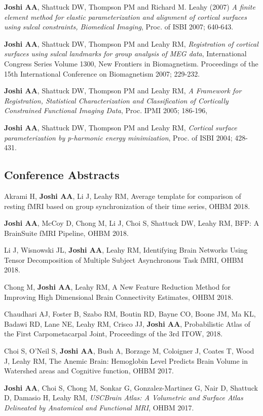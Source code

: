 \documentclass[overlapped,line,letterpaper]{res}
\begin{document}
\begin{resume}
\textbf{Joshi AA}, Shattuck DW, Thompson PM and Richard M. Leahy (2007) \textit{A finite element method for elastic parameterization and alignment of cortical surfaces using sulcal constraints, Biomedical Imaging}, Proc. of ISBI 2007; 640-643. 

\textbf{Joshi AA}, Shattuck DW, Thompson PM and Leahy RM, \textit{Registration of cortical surfaces using sulcal landmarks for group analysis of MEG data}, International Congress Series Volume 1300, New Frontiers in Biomagnetism. Proceedings of the 15th International Conference on Biomagnetism 2007; 229-232.

\textbf{Joshi AA}, Shattuck DW, Thompson PM and Leahy RM, \textit{A Framework for Registration, Statistical Characterization and Classification of Cortically Constrained Functional Imaging Data}, Proc. IPMI 2005;  186-196,

\textbf{Joshi AA}, Shattuck DW, Thompson PM and Leahy RM, \textit{Cortical surface parameterization by p-harmonic energy minimization}, Proc. of ISBI 2004; 428-431.

\subsection{Conference Abstracts}

Akrami H, \textbf{Joshi AA}, Li J, Leahy RM, Average template for comparison of resting fMRI based on group synchronization of their time series, OHBM 2018.

\textbf{Joshi AA}, McCoy D, Chong M, Li J, Choi S, Shattuck DW, Leahy RM, BFP: A BrainSuite fMRI Pipeline, OHBM 2018.

Li J, Wisnowski JL, \textbf{Joshi AA}, Leahy RM, Identifying Brain Networks Using Tensor Decomposition of Multiple Subject Asynchronous Task fMRI, OHBM 2018.

Chong M, \textbf{Joshi AA}, Leahy RM, A New Feature Reduction Method for Improving High Dimensional Brain Connectivity Estimates, OHBM 2018.

Chaudhari AJ, Foster B, Szabo RM, Boutin RD, Bayne CO, Boone JM, Ma KL, Badawi RD, Lane NE, Leahy RM, Crisco JJ, \textbf{Joshi AA}, Probabilistic Atlas of the First Carpometacarpal Joint, Proceedings of the 3rd ITOW, 2018.

Choi S, O'Neil S, \textbf{Joshi AA}, Bush A, Borzage M, Coloigner J, Coates T, Wood J, Leahy RM, The Anemic Brain: Hemoglobin Level Predicts Brain Volume in Watershed areas and Cognitive function, OHBM 2017.

\textbf{Joshi AA}, Choi S, Chong M, Sonkar G, Gonzalez-Martinez G, Nair D, Shattuck D,  Damasio H, Leahy RM, \textit{USCBrain Atlas: A Volumetric and Surface Atlas Delineated by Anatomical and
Functional MRI}, OHBM 2017.


\end{resume}
\end{document}
